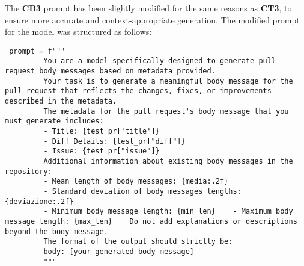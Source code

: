 The \textbf{CB3} prompt has been slightly modified for the same reasons as \textbf{CT3}, to ensure more accurate and context-appropriate generation.
The modified prompt for the model was structured as follows:
\begin{verbatim}
 prompt = f"""    
         You are a model specifically designed to generate pull request body messages based on metadata provided.    
         Your task is to generate a meaningful body message for the pull request that reflects the changes, fixes, or improvements described in the metadata.  
         The metadata for the pull request's body message that you must generate includes:    
         - Title: {test_pr['title']}  
         - Diff Details: {test_pr["diff"]}  
         - Issue: {test_pr["issue"]}    
         Additional information about existing body messages in the repository:   
         - Mean length of body messages: {media:.2f}
         - Standard deviation of body messages lengths: {deviazione:.2f}   
         - Minimum body message length: {min_len}    - Maximum body message length: {max_len}    Do not add explanations or descriptions beyond the body message.  
         The format of the output should strictly be:
         body: [your generated body message]
         """
\end{verbatim}